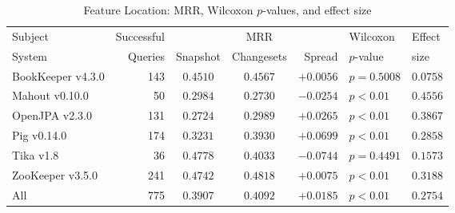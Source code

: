 \begin{table}[t]
\centering
\caption{Feature Location: MRR, Wilcoxon $p$-values, and effect size}
\begin{tabular}{l|r|ccr|ll}
\toprule
Subject & Successful &    & MRR &        & Wilcoxon  & Effect \\
System  & Queries    & Snapshot & Changesets  & Spread & $p$-value & size \\
\midrule
BookKeeper v4.3.0 & 143 & $0.4510$ & $\bm{0.4567}$ & $+0.0056$ & $p = 0.5008$ & $0.0758$ \\
Mahout v0.10.0 & 50 & $\bm{0.2984}$ & $0.2730$ & $-0.0254$ & $p < 0.01$ & $0.4556$ \\
OpenJPA v2.3.0 & 131 & $0.2724$ & $\bm{0.2989}$ & $+0.0265$ & $p < 0.01$ & $0.3867$ \\
Pig v0.14.0 & 174 & $0.3231$ & $\bm{0.3930}$ & $+0.0699$ & $p < 0.01$ & $0.2858$ \\
Tika v1.8 & 36 & $\bm{0.4778}$ & $0.4033$ & $-0.0744$ & $p = 0.4491$ & $0.1573$ \\
ZooKeeper v3.5.0 & 241 & $0.4742$ & $\bm{0.4818}$ & $+0.0075$ & $p < 0.01$ & $0.3188$ \\
\midrule
All & 775 & $0.3907$ & $\bm{0.4092}$ & $+0.0185$ & $p < 0.01$ & $0.2754$ \\
\bottomrule
\end{tabular}
\label{table:feature_location_rq1}
\end{table}
